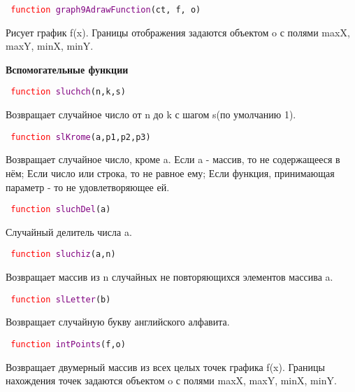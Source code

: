 \texttt{
	\textcolor{Red}{function} \textcolor{Purple}{graph9AdrawFunction}(ct, f, o)
}

Рисует график f(x). Границы отображения задаются объектом o с полями maxX, maxY, minX, minY.

\textbf{Вспомогательные функции}

\texttt{
	\textcolor{Red}{function} \textcolor{Purple}{sluchch}(n,k,s)
}

Возвращает случайное число от n до k с шагом s(по умолчанию 1).

\texttt{
	\textcolor{Red}{function} \textcolor{Purple}{slKrome}(a,p1,p2,p3)
}

Возвращает случайное число, кроме a. Если a \-- массив, то не содержащееся в нём; Если число или строка, то не равное ему; Если функция, принимающая параметр - то не удовлетворяющее ей.

\texttt{
	\textcolor{Red}{function} \textcolor{Purple}{sluchDel}(a)
}

Случайный делитель числа a.

\texttt{
	\textcolor{Red}{function} \textcolor{Purple}{sluchiz}(a,n)
}

Возвращает массив из n случайных не повторяющихся элементов массива a.

\texttt{
	\textcolor{Red}{function} \textcolor{Purple}{slLetter}(b)
}

Возвращает случайную букву английского алфавита.

\texttt{
	\textcolor{Red}{function} \textcolor{Purple}{intPoints}(f,o)
}

Возвращает двумерный массив из всех целых точек графика f(x).  Границы нахождения точек задаются объектом o с полями maxX, maxY, minX, minY.


